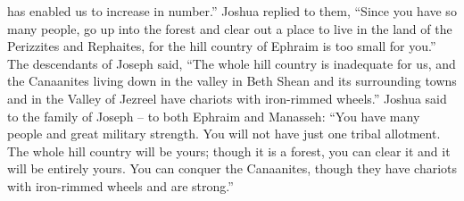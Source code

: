 {{}
has enabled us to increase in number.”
Joshua
replied
to
them, “Since
you
have so many
people,
go up
into the forest
and clear out
a place
to live in the land
of the Perizzites
and Rephaites,
for
the hill country
of Ephraim
is too small for you.”
The descendants
of Joseph
said,
“The whole
hill country
is inadequate
for us, and the Canaanites
living
down in the valley
in Beth Shean
and its surrounding towns
and in the Valley
of Jezreel
have
chariots
with iron-rimmed wheels.”
Joshua
said
to
the family
of Joseph
– to both Ephraim
and Manasseh: “You have many
people
and great
military
strength.
You will not
have just one
tribal allotment.
The whole hill country
will be
yours; though it is a forest,
you can clear
it and it will be
entirely yours.
You can conquer
the Canaanites,
though they have chariots
with iron-rimmed
wheels and are strong.”

}
